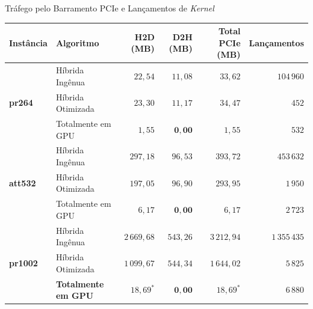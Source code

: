\begin{frame}{Tráfego pelo Barramento PCIe e Lançamentos de \emph{Kernel}}
  \begin{slidetabeladensa}[0.46\textheight]
    \begin{tabular}{@{}llrrrr@{}}
      \toprule
      \textbf{Instância} & \textbf{Algoritmo} & \textbf{H2D (MB)} & \textbf{D2H (MB)} & \textbf{Total PCIe (MB)} & \textbf{Lançamentos} \\
      \midrule
      \multirow{3}{*}{\textbf{pr264}}
        & Híbrida Ingênua   & $22{,}54$    & $11{,}08$  & $33{,}62$    & $104\,960$ \\
        & Híbrida Otimizada & $23{,}30$    & $11{,}17$  & $34{,}47$    & $452$ \\
        & Totalmente em GPU & $1{,}55$     & $\mathbf{0{,}00}$ & $1{,}55$ & $532$ \\
      \midrule
      \multirow{3}{*}{\textbf{att532}}
        & Híbrida Ingênua   & $297{,}18$   & $96{,}53$  & $393{,}72$   & $453\,632$ \\
        & Híbrida Otimizada & $197{,}05$   & $96{,}90$  & $293{,}95$   & $1\,950$ \\
        & Totalmente em GPU & $6{,}17$     & $\mathbf{0{,}00}$ & $6{,}17$ & $2\,723$ \\
      \midrule
      \multirow{3}{*}{\textbf{pr1002}}
        & Híbrida Ingênua   & $2\,669{,}68$ & $543{,}26$ & $3\,212{,}94$ & $1\,355\,435$ \\
        & Híbrida Otimizada & $1\,099{,}67$ & $544{,}34$ & $1\,644{,}02$ & $5\,825$ \\
        \rowcolor{ufscGreenLight}
        & \textbf{Totalmente em GPU} & $18{,}69^*$ & $\mathbf{0{,}00}$ & $18{,}69^*$ & $6\,880$ \\
      \bottomrule
    \end{tabular}
  \end{slidetabeladensa}


\end{frame}
